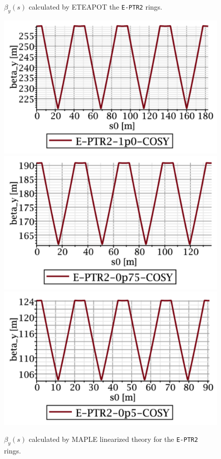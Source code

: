 \documentclass[]{article}
\begin{document}
\begin{figure}[htbp]
\begin{minipage}[b]{0.45\linewidth}
\caption{$\beta_y(s)$ calculated by ETEAPOT the {\tt E-PTR2} rings.}
\label{fig:E-PTR2-ETEAPOT-betay}
\end{minipage}
%
%
\begin{minipage}[b]{0.45\linewidth}
\centering
\includegraphics[scale=0.40]{pdf/E-PTR2-1p0-COSY-MAPLE-betay.pdf}
\includegraphics[scale=0.40]{pdf/E-PTR2-0p75-COSY-MAPLE-betay.pdf}
\includegraphics[scale=0.40]{pdf/E-PTR2-0p5-COSY-MAPLE-betay.pdf}
\caption{$\beta_y(s)$ calculated by MAPLE linearized  theory for 
the {\tt E-PTR2} rings.}
\label{fig:E-PTR2-MAPLE-betay}
\end{minipage}
\end{figure}
%
\end{document}
